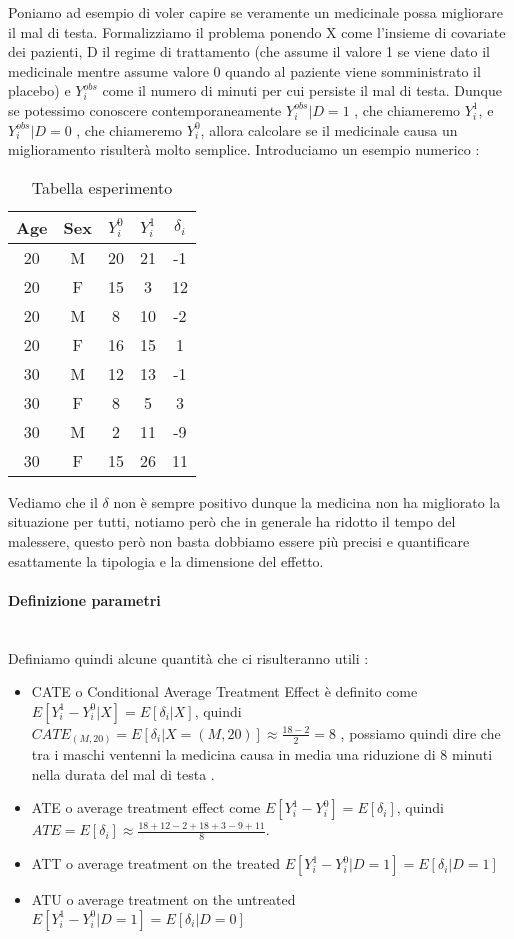 \documentclass{article}
\begin{document}
Poniamo ad esempio di voler capire se veramente un medicinale possa migliorare il mal di testa. Formalizziamo il problema ponendo X come l'insieme di covariate dei pazienti, D il regime di trattamento (che assume il valore 1 se viene dato il medicinale mentre assume valore 0 quando al paziente viene somministrato il placebo) e $Y^{obs}_i$ come il numero di minuti per cui persiste il mal di testa. 
Dunque se potessimo conoscere contemporaneamente  $Y^{obs}_i|D=1$ , che chiameremo $Y^{1}_i$, e $Y^{obs}_i|D=0$ , che chiameremo $Y^{0}_i$, allora calcolare se il medicinale causa un miglioramento risulterà molto semplice. Introduciamo un esempio numerico : 
\begin{table}[H]
\centering
\begin{tabular}{|c|c|c|c|c|}
\hline
Age & Sex & $Y^{0}_i$ & $Y^{1}_i$ & $\delta_i$ \\ \hline
20 & M & 20 & 21 & -1  \\ \hline
20 & F & 15 & 3 & 12 \\ \hline
20 & M & 8 & 10 & -2 \\ \hline
20 & F & 16 & 15 & 1 \\ \hline
30 & M & 12 & 13 & -1 \\ \hline
30 & F & 8 & 5 & 3 \\ \hline
30 & M & 2 & 11 & -9  \\ \hline
30 & F & 15 & 26 & 11 \\ \hline
\end{tabular}
\caption{Tabella esperimento }
\end{table}
Vediamo che il $\delta$ non è sempre positivo dunque la medicina non ha migliorato la situazione per tutti, notiamo però che in generale ha ridotto il tempo del malessere, questo però non basta dobbiamo essere più precisi e quantificare esattamente la tipologia e la dimensione del effetto.

\paragraph{Definizione parametri} \hspace{0pt} \\
\label{parag:param}
Definiamo quindi alcune quantità che ci risulteranno utili : 
\begin{itemize}
\item CATE o Conditional Average Treatment Effect è definito come $E[Y^{1}_i- Y^{0}_i|X] = E[\delta_i|X]$, quindi $CATE_{(M,20)}=E[\delta_i|X=(M,20)] \approx \frac{18-2}{2}=8$ , possiamo quindi dire che tra i maschi ventenni la medicina causa in media una riduzione di 8 minuti nella durata del mal di testa .
\item ATE o average treatment effect come  $E[Y^{1}_i- Y^{0}_i] = E[\delta_i]$, quindi $ATE= E[\delta_i] \approx \frac{18+12-2+18+3-9+11}{8}$.

\item ATT o average treatment on the treated $E[Y^{1}_i- Y^{0}_i|D=1] = E[\delta_i|D=1]$ 

\item ATU o average treatment on the untreated
$E[Y^{1}_i- Y^{0}_i|D=1] = E[\delta_i|D=0]$
\end{itemize}
 
\end{document}
